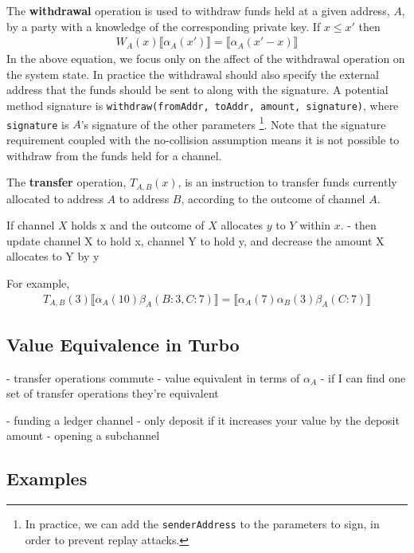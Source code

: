 \documentclass{article}
\theoremstyle{definition}
\newcommand{\adj}[1]{\llbracket #1 \rrbracket}
\begin{document}
The \textbf{withdrawal} operation is used to withdraw funds held at a given 
address, $A$, by a party with a knowledge of the corresponding private key. If $x \leq x'$ then
\begin{align*}
W_A(x) \adj{\alpha_A(x')} = \adj{\alpha_A(x'-x)}
\end{align*}
In the above equation, we focus only on the affect of the withdrawal operation on the system state.
In practice the withdrawal should also specify the external address that the funds should be sent to
along with the signature.
A potential method signature is \texttt{withdraw(fromAddr, toAddr, amount, signature)}, 
where \texttt{signature} is $A$'s signature of the other parameters
\footnote{In practice, we can add the \texttt{senderAddress} to the parameters to sign,
in order to prevent replay attacks.}.
Note that the signature requirement coupled with the no-collision assumption means
it is not possible to withdraw from the funds held for a channel.

The \textbf{transfer} operation, $T_{A,B}(x)$, is an instruction to transfer funds currently allocated
to address $A$ to address $B$, according to the outcome of channel $A$.



If channel $X$ holds x and the outcome of $X$ allocates $y$ to $Y$ within $x$.
- then update channel X to hold x, channel Y to hold y, and decrease the amount X allocates to Y by y

For example, 
\begin{align*}
T_{A,B}(3) \adj{\alpha_A(10)\beta_A(B: 3, C: 7)} = \adj{\alpha_A(7)\alpha_B(3)\beta_A(C: 7)}
\end{align*}

\subsection{Value Equivalence in Turbo}

- transfer operations commute
- value equivalent in terms of $\alpha_A$
- if I can find one set of transfer operations they're equivalent

- funding a ledger channel - only deposit if it increases your value by the deposit amount
- opening a subchannel

\subsection{Examples}
\end{document}
